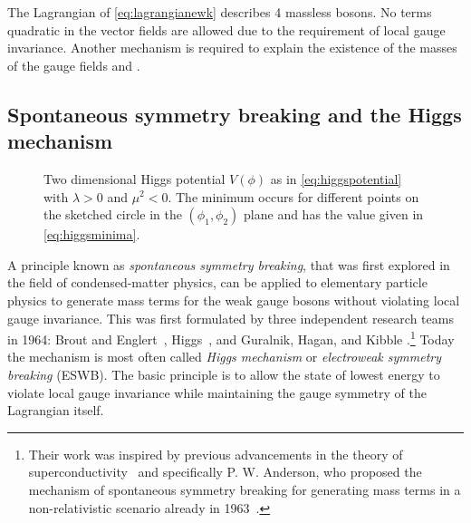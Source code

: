 \noindent The Lagrangian of \cref{eq:lagrangianewk} describes 4 massless bosons. No terms quadratic in the vector fields are allowed due to the requirement of local gauge invariance. 
Another mechanism is required to explain the existence of the masses of the gauge fields \Wpm and \Zboson.



\subsection{Spontaneous symmetry breaking and the Higgs mechanism}
\label{subsec:ewsymbreaking}
\begin{figure}
  \caption[Two dimensional Higgs potential $V(\phi)$ with $\lambda > 0$ and $\mu^2 < 0$.]{Two dimensional Higgs potential $V(\phi)$ as in \cref{eq:higgspotential} with $\lambda > 0$ and $\mu^2 < 0$. The minimum occurs for different points on the sketched circle in the $(\phi_1, \phi_2)$ plane and has the value given in \cref{eq:higgsminima}.
  }
  \label{fig:higgspotential}
\end{figure}


A principle known as \emph{spontaneous symmetry breaking}, that was first explored in the field of condensed-matter physics, can be applied to elementary particle physics to generate mass terms for the weak gauge bosons without violating local gauge invariance.
This was first formulated by three independent research teams in 1964: Brout and Englert~\cite{PhysRevLett.13.321}, Higgs~\cite{PhysRevLett.13.508,HIGGS1964132}, and Guralnik, Hagan, and Kibble \cite{PhysRevLett.13.585}.\footnote{Their work was inspired by previous advancements in the theory of superconductivity~\cite{PhysRev.108.1175} and specifically P. W. Anderson, who proposed the mechanism of spontaneous symmetry breaking for generating mass terms in a non-relativistic scenario already in 1963~\cite{PhysRev.130.439}.}
Today the mechanism is most often called \emph{Higgs mechanism} or \emph{electroweak symmetry breaking} (ESWB).
The basic principle is to allow the state of lowest energy to violate local gauge invariance while maintaining the gauge symmetry of the Lagrangian itself.

